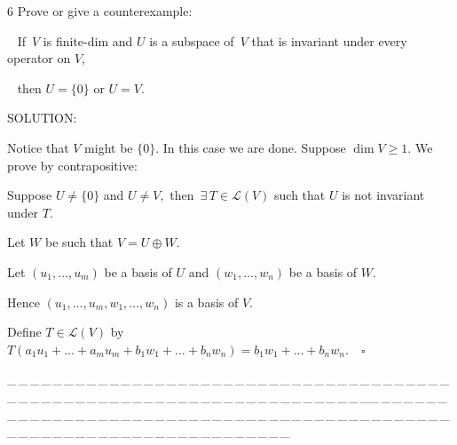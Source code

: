 \documentclass[a4paper, 11pt, UTF8]{article}
\def\Lm{\mathcal{L}}
\begin{document}
\begin{large}
{\timesbf\Large 6} {\timessl\Large 
Prove or give a counterexample:}\par\,\,\,
{\timessl\Large If \,$V$ is finite-dim and $U$ is a subspace of \,$V$ that is invariant under every operator on $V$,}\par\,\,\,
{\timessl\Large then $U = \{0\}$ or $U = V$.
}\par
{\timesbf S\footnotesize{OLUTION:}}\par\quad
Notice that $V$ might be $\{0\}$. In this case we are done. Suppose $\dim V\geq 1.$ We prove by contrapositive:\par\qquad\quad
Suppose $U\neq\{0\}$ and $U\neq V,$ then $\,\exists\,T\in\Lm(V)$ such that $U$ is not invariant under $T$.\par\quad
Let $W$ be such that $V=U\oplus W.$\par\quad
Let $(u_1,\dots,u_m)$ be a basis of $U$ and $(w_1,\dots,w_n)$ be a basis of $W.$\par\quad
Hence $(u_1,\dots,u_m,w_1,\dots,w_n)$ is a basis of $V$.\par\quad
Define $T\in\Lm(V)$ by $T(a_1 u_1+\dots+a_m u_m+b_1 w_1+\dots+b_n w_n)=b_1 w_1+\dots+b_n w_n.\quad\square$\par
{\tiny \_\,\_\,\_\,\_\,\_\,\_\,\_\,\_\,\_\,\_\,\_\,\_\,\_\,\_\,\_\,\_\,\_\,\_\,\_\,\_\,\_\,\_\,\_\,\_\,\_\,\_\,\_\,\_\,\_\,\_\,\_\,\_\,\_\,\_\,\_\,\_\,\_\,\_\,\_\,\_\,\_\,\_\,\_\,\_\,\_\,\_\,\_\,\_\,\_\,\_\,\_\,\_\,\_\,\_\,\_\,\_\,\_\,\_\,\_\,\_\,\_\,\_\,\_\,\_\,\_\,\_\,\_\,\_\,\_\,\_\,\_\_\,\_\,\_\,\_\,\_\,\_\,\_\,\_\,\_\,\_\,\_\,\_\,\_\,\_\,\_\,\_\,\_\,\_\,\_\,\_\,\_\,\_\,\_\,\_\,\_\,\_\,\_\,\_\,\_\,\_\,\_\,\_\,\_\,\_\,\_\,\_\,\_\,\_\,\_\,\_\,\_\,\_\,\_\,\_\,\_\,\_\,\_\,\_\,\_\,\_\,\_\,\_\,\_\,\_\,\_\,\_\,\_\,\_\,\_\,\_\,\_\,\_\,\_\,\_\,\_\,\_\,\_\,\_\,\_\,\_\,\_}\par


\end{large}
\end{document}
